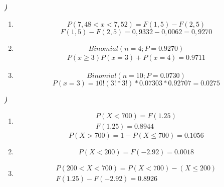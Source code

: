 \documentclass[12pt]{article}
\newcounter{instn}
\newcommand{\instnum}{\arabic{instn}}
\newcommand{\myline}[1]{
    \emph{\textbf{#1)}}
    \addtocounter{instn}{1}
}
\newenvironment{question}
 {
    \myline{\instnum} 
    }
    {
 }
\begin{document}
    \begin{question}

        \begin{enumerate}[label={\textbf{\alph*)}}]
            \item 
            \[
                P (7,48 < x < 7,52) = F(1,5) - F(2,5) 
            \]
            \[
                F(1,5) - F(2,5) = 0,9332 - 0,0062 = 0,9270
            \]

            \item 
            \[
                Binomial(n = 4; P= 0.9270)
            \]
            \begin{align*}
                P(x \geq 3) P(x=3) + P(x=4) = 0.9711 
            \end{align*}
            \item 
            \[
                Binomial(n = 10; P= 0.0730)
            \]
            \begin{equation}
                P(x = 3) = 10!(3!*3!)*0.07303*0.92707 = 0.0275 
            \end{equation}
        \end{enumerate}
        
    \end{question}


    \begin{question}
        
        \begin{enumerate}[label={\textbf{\alph*)}}]
            \item 
            \begin{align*}
                P(X < 700) = F(1.25) \\ 
                F(1.25) = 0.8944
            \end{align*}
            \begin{equation}
                P(X > 700)  = 1 - P(X \leq 700) = 0.1056
            \end{equation}
            \item 
            \begin{equation}
                P(X < 200) = F(-2.92) = 0.0018
            \end{equation}
            \item
            \begin{align*}
                P(200 < X < 700) = P(X < 700) - (X \leq 200) \\
                F(1.25) - F(-2.92) = 0.8926
            \end{align*}
        \end{enumerate}

    \end{question}
\end{document}
